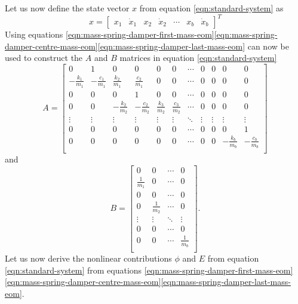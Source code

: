 Let us now define the state vector $x$ from equation \eqref{eqn:standard-system} as
\begin{equation}\label{eqn:msd-x}
    x =
    \begin{bmatrix}
        x_1 & \dot{x}_1 & x_2 & \dot{x}_2 & \cdots & x_b & \dot{x}_{b}
    \end{bmatrix}^T
\end{equation}
Using equations \eqref{eqn:mass-spring-damper-first-mass-eom}\eqref{eqn:mass-spring-damper-centre-mass-eom}\eqref{eqn:mass-spring-damper-last-mass-eom} can now be used to construct the $A$ and $B$ matrices in equation \eqref{eqn:standard-system}
\begin{equation}\label{eqn:msd-A}
    A =
    \begin{bmatrix}
        0 & 1 & 0 & 0 & 0 & 0 & \cdots & 0 & 0 & 0 & 0 \\
        -\frac{k_1}{m_1} & -\frac{c_1}{m_1} & \frac{k_2}{m_1} & \frac{c_2}{m_1} & 0 & 0 & \cdots & 0 & 0 & 0 & 0 \\
        0 & 0 & 0 & 1 & 0 & 0 & \cdots & 0 & 0 & 0 & 0 \\
       0 & 0 & -\frac{k_2}{m_2} & -\frac{c_2}{m_2} & \frac{k_3}{m_2} & \frac{c_3}{m_2} & \cdots & 0 & 0 & 0 & 0 \\
        \vdots & \vdots & \vdots & \vdots & \vdots & \vdots & \ddots & \vdots & \vdots & \vdots & \vdots \\
        0 & 0 & 0 & 0 & 0 & 0 & \cdots & 0 & 0 & 0 & 1 \\
        0 & 0 & 0 & 0 & 0 & 0 & \cdots & 0 & 0 & -\frac{k_b}{m_b} & -\frac{c_b}{m_b} \\
    \end{bmatrix}
\end{equation}
and
\begin{equation}\label{eqn:msd-B}
    B = 
    \begin{bmatrix}
        0 & 0 & \cdots & 0 \\
        \frac{1}{m_1} & 0 & \cdots & 0 \\
        0 & 0 & \cdots & 0 \\
        0 & \frac{1}{m_2} & \cdots & 0 \\
        \vdots & \vdots & \ddots & \vdots \\
        0 & 0 & \cdots & 0 \\
        0 & 0 & \cdots & \frac{1}{m_b} \\
    \end{bmatrix}.
\end{equation}
Let us now derive the nonlinear contributions $\phi$ and $E$ from equation \eqref{eqn:standard-system} from equations \eqref{eqn:mass-spring-damper-first-mass-eom}\eqref{eqn:mass-spring-damper-centre-mass-eom}\eqref{eqn:mass-spring-damper-last-mass-eom}.
